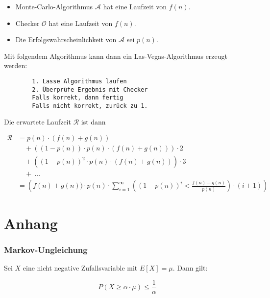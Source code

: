 \documentclass{scrartcl}%
\begin{document}
    \begin{itemize}
        \item Monte-Carlo-Algorithmus $\mathcal{A}$ hat eine Laufzeit von $f(n)$.
        \item Checker $\mathcal{O}$ hat eine Laufzeit von $f(n)$.
        \item Die Erfolgswahrscheinlichkeit von $\mathcal{A}$ sei $p(n)$.
    \end{itemize}

    Mit folgendem Algorithmus kann dann ein Las-Vegas-Algorithmus erzeugt werden:

    \begin{lstlisting}
        1. Lasse Algorithmus laufen
        2. Überprüfe Ergebnis mit Checker
        Falls korrekt, dann fertig
        Falls nicht korrekt, zurück zu 1.
    \end{lstlisting}

    Die erwartete Laufzeit $\mathcal{R}$ ist dann

    \begin{equation*}
        \begin{flalign}
            \mathcal{R} &= p(n) \cdot (f(n) + g(n))&&\\\nonumber
            &\quad + ((1 - p(n)) \cdot p(n) \cdot (f(n) + g(n))) \cdot 2&&\\\nonumber
            &\quad + ((1 - p(n))^2 \cdot p(n) \cdot (f(n) + g(n))) \cdot 3&&\\\nonumber
            &\quad +\ ...&&\\\nonumber
            &=\left( f(n) + g(n)) \cdot p(n) \cdot \sum^{\infty}_{i=1}((1-p(n))^i < \frac{f(n) + g(n)}{p(n)}) \cdot (i+1)\right)
        \end{flalign}
    \end{equation*}

    \hrulefill

    \section*{Anhang}
    \label{sec:anhang}

    \subsubsection*{Markov-Ungleichung}
    Sei $X$ eine nicht negative Zufallsvariable mit $E[X] = \mu$.
    Dann gilt:

    \begin{equation*}
        P(X \geq \alpha \cdot \mu ) \leq \frac{1}{\alpha}
    \end{equation*}
\end{document}
